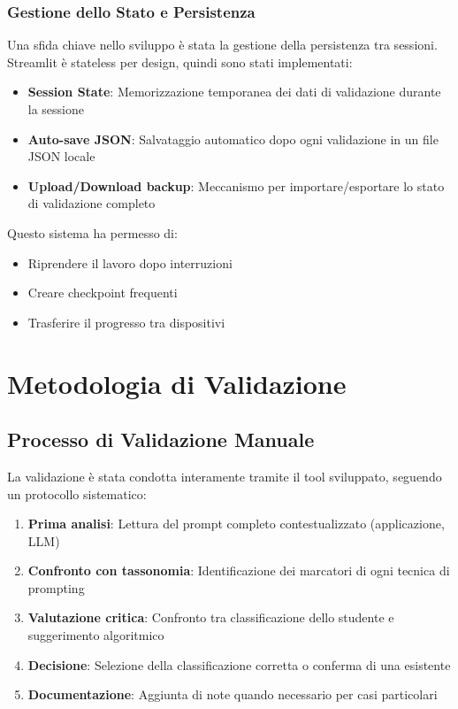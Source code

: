 \documentclass[a4paper,12pt]{article}
\begin{document}
\subsubsection{Gestione dello Stato e Persistenza}
Una sfida chiave nello sviluppo è stata la gestione della persistenza tra sessioni. Streamlit è stateless per design, quindi sono stati implementati:

\begin{itemize}
    \item \textbf{Session State}: Memorizzazione temporanea dei dati di validazione durante la sessione
    \item \textbf{Auto-save JSON}: Salvataggio automatico dopo ogni validazione in un file JSON locale
    \item \textbf{Upload/Download backup}: Meccanismo per importare/esportare lo stato di validazione completo
\end{itemize}

Questo sistema ha permesso di:
\begin{itemize}
    \item Riprendere il lavoro dopo interruzioni
    \item Creare checkpoint frequenti
    \item Trasferire il progresso tra dispositivi
\end{itemize}

\section{Metodologia di Validazione}

\subsection{Processo di Validazione Manuale}
La validazione è stata condotta interamente tramite il tool sviluppato, seguendo un protocollo sistematico:

\begin{enumerate}
    \item \textbf{Prima analisi}: Lettura del prompt completo contestualizzato (applicazione, LLM)
    \item \textbf{Confronto con tassonomia}: Identificazione dei marcatori di ogni tecnica di prompting
    \item \textbf{Valutazione critica}: Confronto tra classificazione dello studente e suggerimento algoritmico
    \item \textbf{Decisione}: Selezione della classificazione corretta o conferma di una esistente
    \item \textbf{Documentazione}: Aggiunta di note quando necessario per casi particolari
\end{enumerate}
\end{document}
